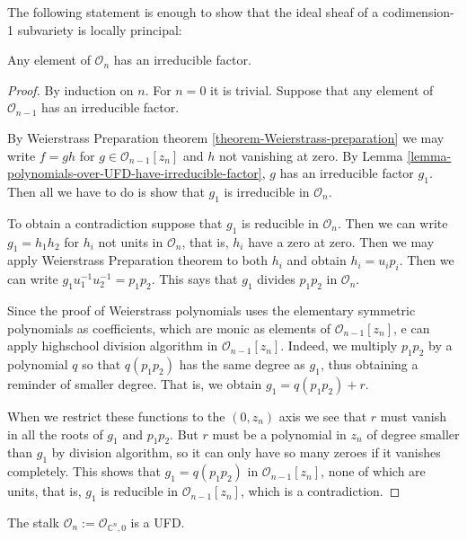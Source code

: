 The following statement is enough to show that the ideal sheaf of a
codimension-1 subvariety is locally principal:

\begin{lemma}
\label{lemma-}
Any element of $\mathcal{O}_n$ has an irreducible factor.
\end{lemma}

\begin{proof}
By induction on $n$. For $n=0$ it is trivial. Suppose that any element of
$\mathcal{O}_{n-1}$ has an irreducible factor.

By Weierstrass Preparation theorem \ref{theorem-Weierstrass-preparation} we may
write $f=gh$ for $g\in \mathcal{O}_{n-1}[z_n]$ and $h$ not vanishing at zero. By
Lemma \ref{lemma-polynomials-over-UFD-have-irreducible-factor}, $g$ has an
irreducible factor $g_1$. Then all we have to do is show that $g_1$ is
irreducible in $\mathcal{O}_n$.

To obtain a contradiction suppose that $g_1$ is reducible in
$\mathcal{O}_n$. Then we can write $g_1=h_1h_2$ for $h_i$ not units in
$\mathcal{O}_n$, that is, $h_i$ have a zero at zero. Then we may apply
Weierstrass Preparation theorem to both $h_i$ and obtain $h_i=u_ip_i$. Then we
can write $g_1u_1^{-1}u_2^{-1}=p_1p_2$. This says that $g_1$ divides $p_1p_2$ in
$\mathcal{O}_n$.

Since the proof of Weierstrass polynomials uses the elementary symmetric
polynomials as coefficients, which are monic as elements of
$\mathcal{O}_{n-1}[z_n]$, e can apply highschool division algorithm in
$\mathcal{O}_{n-1}[z_n]$. Indeed, we multiply $p_1p_2$ by a polynomial $q$ so
that $q(p_1p_2)$ has the same degree as $g_1$, thus obtaining a reminder of
smaller degree. That is, we obtain $g_1=q(p_1p_2)+r$.

When we restrict these functions to the $(0,z_n)$ axis we see that $r$ must
vanish in all the roots of $g_1$ and $p_1p_2$. But $r$ must be a polynomial in
$z_n$ of degree smaller than $g_1$ by division algorithm, so it can only have so
many zeroes if it vanishes completely. 
This shows that $g_1=q(p_1p_2)$ in $\mathcal{O}_{n-1}[z_n]$, none of which are
units, that is, $g_1$ is reducible in $\mathcal{O}_{n-1}[z_n]$, which is a
contradiction.
\end{proof}

\begin{lemma}
\label{lemma-stalk-is-UFD}
The stalk $\mathcal{O}_n:=\mathcal{O}_{\mathbb{C}^n,0}$ is a UFD.
\end{lemma}

